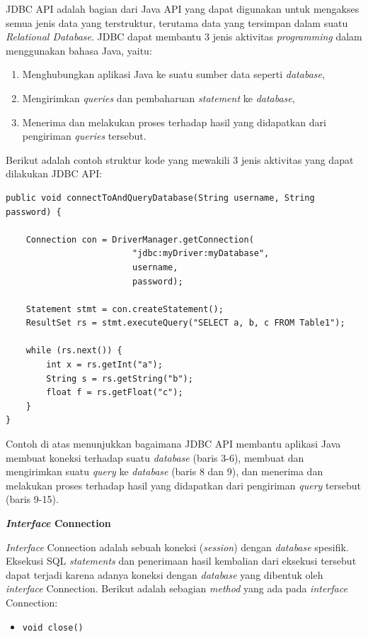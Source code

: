 \documentclass[a4paper,twoside]{article}
\begin{document}
\begin{enumerate}
\begin{itemize}
JDBC API adalah bagian dari Java API yang dapat digunakan untuk mengakses semua jenis data yang terstruktur, terutama data yang tersimpan dalam suatu \textit{Relational Database}\cite{javadocumentation}. JDBC dapat membantu 3 jenis aktivitas \textit{programming} dalam menggunakan bahasa Java, yaitu:
\begin{enumerate}
	\item Menghubungkan aplikasi Java ke suatu sumber data seperti \textit{database},
	\item Mengirimkan \textit{queries} dan pembaharuan \textit{statement} ke \textit{database},
	\item Menerima dan melakukan proses terhadap hasil yang didapatkan dari pengiriman \textit{queries} tersebut.
\end{enumerate}
Berikut adalah contoh struktur kode yang mewakili 3 jenis aktivitas yang dapat dilakukan JDBC API:

\begin{lstlisting}
public void connectToAndQueryDatabase(String username, String password) {

    Connection con = DriverManager.getConnection(
                         "jdbc:myDriver:myDatabase",
                         username,
                         password);

    Statement stmt = con.createStatement();
    ResultSet rs = stmt.executeQuery("SELECT a, b, c FROM Table1");

    while (rs.next()) {
        int x = rs.getInt("a");
        String s = rs.getString("b");
        float f = rs.getFloat("c");
    }
}
\end{lstlisting}

Contoh di atas menunjukkan bagaimana JDBC API membantu aplikasi Java membuat koneksi terhadap suatu \textit{database} (baris 3-6), membuat dan mengirimkan suatu \textit{query} ke \textit{database} (baris 8 dan 9), dan menerima dan melakukan proses terhadap hasil yang didapatkan dari pengiriman \textit{query} tersebut (baris 9-15).

\textbf{\textit{Interface} Connection}

\textit{Interface} Connection adalah sebuah koneksi (\textit{session}) dengan \textit{database} spesifik\cite{javadocumentation}. Eksekusi SQL \textit{statements} dan penerimaan hasil kembalian dari eksekusi tersebut dapat terjadi karena adanya koneksi dengan \textit{database} yang dibentuk oleh \textit{interface} Connection. Berikut adalah sebagian \textit{method} yang ada pada \textit{interface} Connection:
\begin{itemize}
	\item \texttt{void close()}
	

\end{itemize}
\end{itemize}
\end{enumerate}
\end{document}
